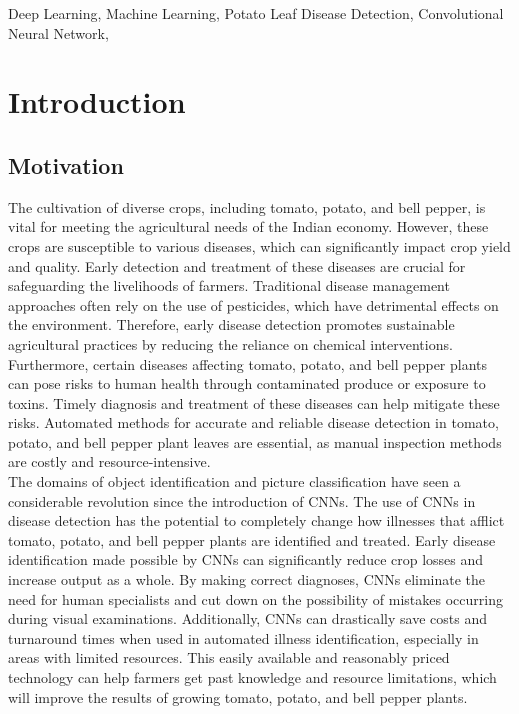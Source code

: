 \documentclass[conference]{IEEEtran}
\begin{document}
\begin{IEEEkeywords}
Deep Learning, Machine Learning, Potato Leaf Disease Detection, Convolutional Neural Network, 
\end{IEEEkeywords}
 
\IEEEpeerreviewmaketitle



\section{Introduction}



\subsection{Motivation}
The cultivation of diverse crops, including tomato, potato, and bell pepper, is vital for meeting the agricultural needs of the Indian economy. However, these crops are susceptible to various diseases, which can significantly impact crop yield and quality. Early detection and treatment of these diseases are crucial for safeguarding the livelihoods of farmers. Traditional disease management approaches often rely on the use of pesticides, which have detrimental effects on the environment. Therefore, early disease detection promotes sustainable agricultural practices by reducing the reliance on chemical interventions. Furthermore, certain diseases affecting tomato, potato, and bell pepper plants can pose risks to human health through contaminated produce or exposure to toxins. Timely diagnosis and treatment of these diseases can help mitigate these risks. Automated methods for accurate and reliable disease detection in tomato, potato, and bell pepper plant leaves are essential, as manual inspection methods are costly and resource-intensive. \\ 

The domains of object identification and picture classification have seen a considerable revolution since the introduction of CNNs. The use of CNNs in disease detection has the potential to completely change how illnesses that afflict tomato, potato, and bell pepper plants are identified and treated. Early disease identification made possible by CNNs can significantly reduce crop losses and increase output as a whole. By making correct diagnoses, CNNs eliminate the need for human specialists and cut down on the possibility of mistakes occurring during visual examinations. Additionally, CNNs can drastically save costs and turnaround times when used in automated illness identification, especially in areas with limited resources. This easily available and reasonably priced technology can help farmers get past knowledge and resource limitations, which will improve the results of growing tomato, potato, and bell pepper plants.\\
\end{document}
